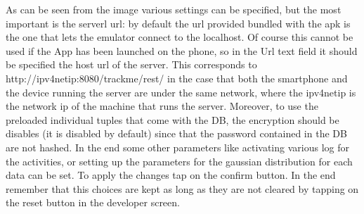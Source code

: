 As can be seen from the image various settings can be specified, but the most important is the serverl url: by default the url provided bundled with the apk is the one that lets the emulator connect to the localhost. Of course this cannot be used if the App has been launched on the phone, so in the Url text field it should be specified the host url of the server. This corresponds  to http://ipv4netip:8080/trackme/rest/ in the case that both the smartphone and the device running the server are under the same network, where the ipv4netip is the network ip of the machine that runs the server.
Moreover, to use the preloaded individual tuples that come with the DB, the encryption should be disables (it is disabled by default) since that the password contained in the DB are not hashed.
In the end some other parameters like activating various log for the activities, or setting up the parameters for the gaussian distribution for each data can be set.
To apply the changes tap on the confirm button.
In the end remember that this choices are kept as long as they are not cleared by tapping on the reset button in the developer screen.
